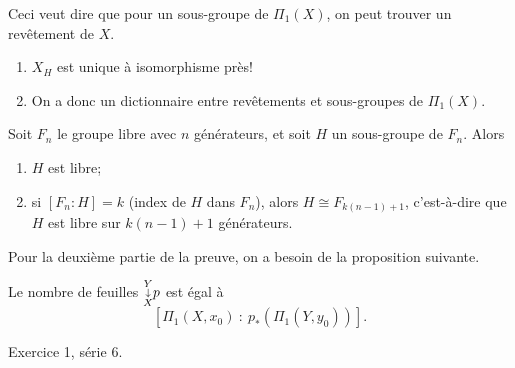    Ceci veut dire que pour un sous-groupe de $\Pi_1(X)$, on peut trouver un revêtement de $X$.

   \begin{rem}
     \begin{enumerate}
     \item $X_H$ est unique à isomorphisme près!
     \item On a donc un dictionnaire entre revêtements et sous-groupes de $\Pi_1(X)$. \qedhere
     \end{enumerate}
   \end{rem}



   \begin{theo} 
     Soit $F_n$ le groupe libre avec $n$ générateurs, et soit $H$ un sous-groupe de $F_n$. Alors
     \begin{enumerate}
     \item $H$ est libre;
     \item si $[F_n : H] = k$ (index de $H$ dans $F_n$), alors $H \cong F_{k(n-1)+1}$, c'est-à-dire que $H$
       est libre sur $k(n-1)+1$ générateurs.
     \end{enumerate}
   \end{theo}

   Pour la deuxième partie de la preuve, on a besoin de la proposition suivante.

   \begin{prop} \label{prop:prop-1}
     Le nombre de feuilles $\substack{Y\\\downarrow\\ X}p$ est égal à
       \[\left[ \Pi_1(X, x_0)\ :\ p_\ast\left(\Pi_1(Y, y_0) \right) \right].\]
   \end{prop}

   \begin{preuve}
     Exercice 1, série 6.
   \end{preuve}

